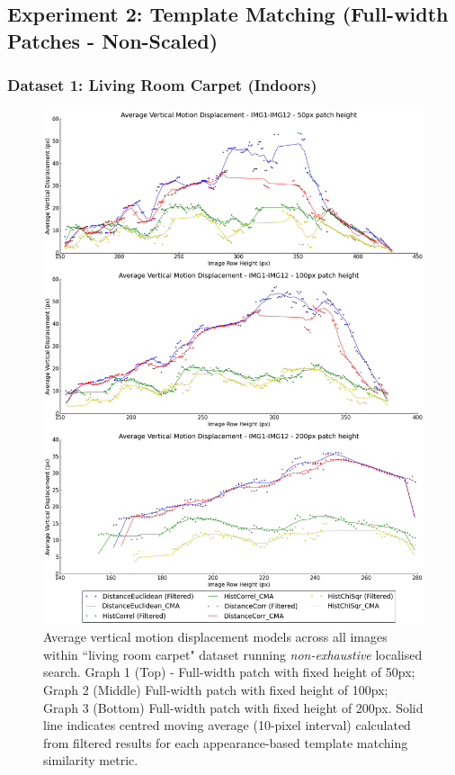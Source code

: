 \clearpage
\subsection{Experiment 2: Template Matching (Full-width Patches - Non-Scaled)}

\subsubsection{Dataset 1: Living Room Carpet (Indoors)}

\begin{figure}[ht!]
\centering
\includegraphics[scale=0.3]{images/results/flat_10cm_non_scaled}
\caption{Average vertical motion displacement models across all images within ``living room carpet" dataset running \textit{non-exhaustive} localised search. Graph 1 (Top) - Full-width patch with fixed height of 50px; Graph 2 (Middle) Full-width patch with fixed height of 100px; Graph 3 (Bottom) Full-width patch with fixed height of 200px. Solid line indicates centred moving average (10-pixel interval) calculated from filtered results for each appearance-based template matching similarity metric.}
\label{fig:ex2_1_1}
\end{figure}

